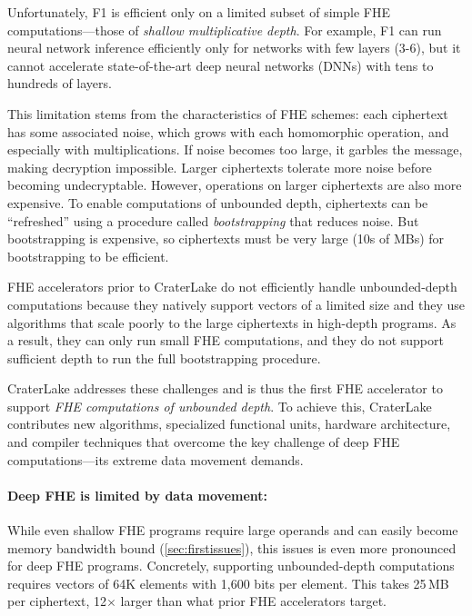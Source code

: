 Unfortunately, F1 is efficient only on a limited subset of simple FHE
computations---those of \emph{shallow multiplicative depth}. For example, F1
can run neural network inference efficiently only for networks with few layers
(3-6), but it cannot accelerate state-of-the-art deep neural networks (DNNs)
with tens to hundreds of layers.

This limitation stems from the characteristics of FHE schemes: each ciphertext
has some associated noise, which grows with each homomorphic operation, and
especially with multiplications. If noise becomes too large, it garbles the
message, making decryption impossible. Larger ciphertexts tolerate more noise
before becoming undecryptable. However, operations on larger ciphertexts are
also more expensive. To enable computations of unbounded depth, ciphertexts can
be ``refreshed'' using a procedure called \emph{bootstrapping} that reduces
noise. But bootstrapping is expensive, so ciphertexts must be very large (10s
of MBs) for bootstrapping to be efficient.

FHE accelerators prior to CraterLake do not efficiently handle unbounded-depth computations
because they natively support vectors of a limited size and they use algorithms
that scale poorly to the large ciphertexts in high-depth programs. As a result,
they can only run small FHE computations, and they do not support sufficient
depth to run the full bootstrapping procedure.

CraterLake addresses these challenges and is thus the first FHE accelerator
to support \emph{FHE computations of unbounded depth}. To achieve this, CraterLake
contributes new algorithms, specialized functional units, hardware architecture,
and compiler techniques that overcome the key challenge of deep FHE
computations---its extreme data movement demands.

\paragraph{Deep FHE is limited by data movement:}
While even shallow FHE programs require large operands and can
easily become memory bandwidth bound (\autoref{sec:firstissues}),
this issues is even more pronounced for deep FHE programs.
Concretely, supporting unbounded-depth computations requires vectors of 64K
elements with 1,600 bits per element. This takes 25\,MB per ciphertext,
12$\times$ larger than what prior FHE accelerators target.

